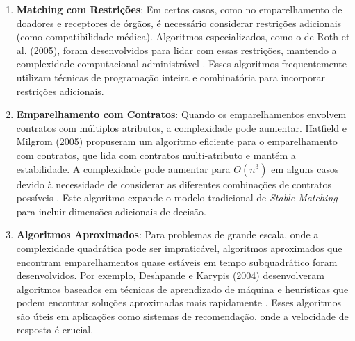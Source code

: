 \documentclass[12pt]{article}
\begin{document}
\begin{enumerate}
    \item \textbf{Matching com Restrições}: Em certos casos, como no emparelhamento de doadores e receptores de órgãos, é necessário considerar restrições adicionais (como compatibilidade médica). Algoritmos especializados, como o de Roth et al. (2005), foram desenvolvidos para lidar com essas restrições, mantendo a complexidade computacional administrável \cite{roth2005kidney}. Esses algoritmos frequentemente utilizam técnicas de programação inteira e combinatória para incorporar restrições adicionais.
    
    \item \textbf{Emparelhamento com Contratos}: Quando os emparelhamentos envolvem contratos com múltiplos atributos, a complexidade pode aumentar. Hatfield e Milgrom (2005) propuseram um algoritmo eficiente para o emparelhamento com contratos, que lida com contratos multi-atributo e mantém a estabilidade. A complexidade pode aumentar para \(O(n^3)\) em alguns casos devido à necessidade de considerar as diferentes combinações de contratos possíveis \cite{hatfield2005matching}. Este algoritmo expande o modelo tradicional de \textit{Stable Matching} para incluir dimensões adicionais de decisão.
    
    \item \textbf{Algoritmos Aproximados}: Para problemas de grande escala, onde a complexidade quadrática pode ser impraticável, algoritmos aproximados que encontram emparelhamentos quase estáveis em tempo subquadrático foram desenvolvidos. Por exemplo, Deshpande e Karypis (2004) desenvolveram algoritmos baseados em técnicas de aprendizado de máquina e heurísticas que podem encontrar soluções aproximadas mais rapidamente \cite{deshpande2004item}. Esses algoritmos são úteis em aplicações como sistemas de recomendação, onde a velocidade de resposta é crucial.
\end{enumerate}




\end{document}
